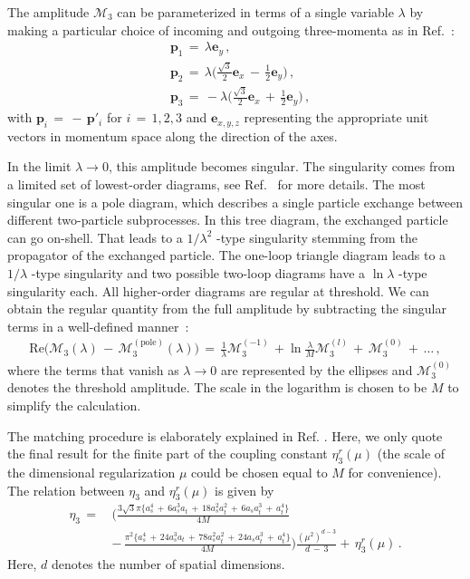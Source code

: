 \documentclass[12pt,prd,tightenlines,nofootinbib]{revtex4-2}
\begin{document}
The amplitude $\mathscr{M}_{3}$ can be parameterized in terms of a single variable
$\lambda$ by making a particular choice of incoming and outgoing three-momenta as in Ref.~\cite{Romero-Lopez:2020rdq}:
\begin{align}
    &\textbf{p}_{1}\, = \, \lambda\textbf{e}_{y}\,,\nonumber\\
    &\textbf{p}_{2}\, = \, \lambda\Big(\frac{\sqrt{3}}{2}\textbf{e}_{x}\, -\, \frac{1}{2}\textbf{e}_{y}\Big)\,,\nonumber\\
    &\textbf{p}_{3}\, = \, -\lambda\Big(\frac{\sqrt{3}}{2}\textbf{e}_{x}\, +\, \frac{1}{2}\textbf{e}_{y}\Big)\,,
\end{align}
with $\textbf{p}_{i}\, =\, -\, \textbf{p}'_{i}$ for $i\, =\, 1,2,3$ and $\textbf{e}_{x,y,z}$ representing the appropriate unit vectors in momentum space along the direction of the axes.


In the limit $\lambda\to 0$, this amplitude becomes singular.
The singularity comes from a limited set of lowest-order diagrams, see
Ref.~\cite{Romero-Lopez:2020rdq} for more details. The most singular
one is a pole diagram, which describes a single particle exchange between different
two-particle subprocesses. In this tree diagram, the exchanged particle can go on-shell.
That leads to a $1/\lambda^2$ -type singularity stemming from the propagator of the
exchanged particle. The one-loop triangle diagram leads to a $1/\lambda$ -type
singularity and two possible two-loop diagrams have a $\ln\lambda$ -type singularity
each. All higher-order diagrams are regular at threshold.
We can obtain the regular quantity from the full amplitude by subtracting the singular terms in a well-defined manner~\cite{Romero-Lopez:2020rdq}:
\begin{align}
   \text{Re}\Big( \mathscr{M}_{3}(\lambda) \, -\, \mathscr{M}_{3}^{(\text{pole})}(\lambda) \Big)\, =\, \frac{1}{\lambda}\mathscr{M}_{3}^{(-1)}\, + \ln{\frac{\lambda}{M}}\mathscr{M}_{3}^{(l)} \, +\, \mathscr{M}_{3}^{(0)}\, + \, \dotsc\,,
\end{align}
where the terms that vanish as $\lambda\to 0$ are represented by the ellipses and
$\mathscr{M}_{3}^{(0)}$ denotes the threshold amplitude. The scale in the logarithm is chosen to be $M$ to simplify the calculation.

The matching procedure is elaborately explained in Ref. \cite{Romero-Lopez:2020rdq}.
Here, we only quote the final result for the finite part of the coupling constant
$\eta_3^r(\mu)$ (the scale of the dimensional regularization $\mu$
could be chosen equal to $M$ for convenience). The relation between $\eta_3$ and $\eta_3^r(\mu)$ is given by
\begin{align}
    \eta_{3}\, = \, &\biggl(\frac{3\sqrt{3}\pi\big\{ a_{s}^{4}\, +\, 6a_{s}^{3}a_{t} \, +\, 18 a_{s}^{2}a_{t}^{2}\, + \, 6a_{s}a_{t}^{3}\, +\, a_{t}^{4} \big\}}{4M}\nonumber\\[2mm]
                    &-\,\frac{\pi^{2}\big\{ a_{s}^{4}\, +\, 24a_{s}^{3}a_{t} \, +\, 78 a_{s}^{2}a_{t}^{2}\, + \, 24a_{s}a_{t}^{3}\, +\, a_{t}^{4} \big\}}{4M}\biggr)
                      \frac{(\mu^{2})^{d-3}}{d \, -\, 3 }
+ \, \eta_{3}^{r}(\mu)\,.
\end{align}
Here, $d$ denotes the number of spatial dimensions.
\end{document}
